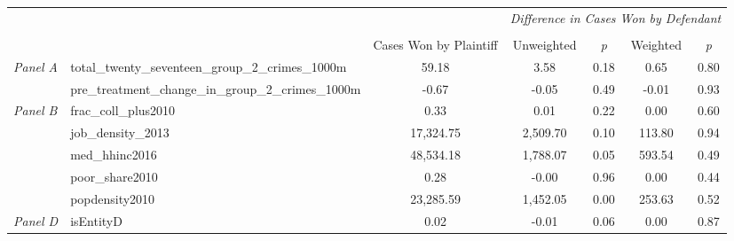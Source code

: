 \begin{tabular}{llccccc}
\toprule
 &  & \textit{} & \multicolumn{4}{c}{\textit{Difference in Cases Won by Defendant}} \\
\cline{4-7}
\\
 &  & Cases Won by Plaintiff & Unweighted & \emph{p} & Weighted & \emph{p} \\
\midrule
\multirow[c]{2}{3cm}{\textit{Panel A}} & total_twenty_seventeen_group_2_crimes_1000m & 59.18 & 3.58 & 0.18 & 0.65 & 0.80 \\
 & pre_treatment_change_in_group_2_crimes_1000m & -0.67 & -0.05 & 0.49 & -0.01 & 0.93 \\
\cline{1-7}
\multirow[c]{5}{3cm}{\textit{Panel B}} & frac_coll_plus2010 & 0.33 & 0.01 & 0.22 & 0.00 & 0.60 \\
 & job_density_2013 & 17,324.75 & 2,509.70 & 0.10 & 113.80 & 0.94 \\
 & med_hhinc2016 & 48,534.18 & 1,788.07 & 0.05 & 593.54 & 0.49 \\
 & poor_share2010 & 0.28 & -0.00 & 0.96 & 0.00 & 0.44 \\
 & popdensity2010 & 23,285.59 & 1,452.05 & 0.00 & 253.63 & 0.52 \\
\cline{1-7}
\textit{Panel D} & isEntityD & 0.02 & -0.01 & 0.06 & 0.00 & 0.87 \\
\cline{1-7}
\bottomrule
\end{tabular}

